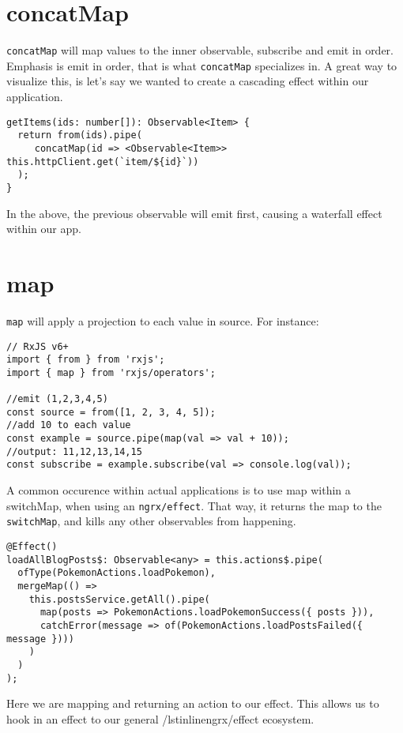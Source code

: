 \section{concatMap}
\lstinline{concatMap} will map values to the inner observable, subscribe and 
emit in order. Emphasis is emit in order, that is what \lstinline{concatMap} 
specializes in. A great way to visualize this, is let's say we wanted to 
create a cascading effect within our application. 

\begin{lstlisting}[caption=data-table.component.ts]
getItems(ids: number[]): Observable<Item> {
  return from(ids).pipe(
     concatMap(id => <Observable<Item>> this.httpClient.get(`item/${id}`))
  );
}
\end{lstlisting}

In the above, the previous observable will emit first, causing a waterfall 
effect within our app. 

\section{map} 
\lstinline{map} will apply a projection to each value in source. For instance: 
\begin{lstlisting}[caption=rxjs map example]
// RxJS v6+
import { from } from 'rxjs';
import { map } from 'rxjs/operators';

//emit (1,2,3,4,5)
const source = from([1, 2, 3, 4, 5]);
//add 10 to each value
const example = source.pipe(map(val => val + 10));
//output: 11,12,13,14,15
const subscribe = example.subscribe(val => console.log(val));
\end{lstlisting}

A common occurence within actual applications is to use map within a 
switchMap, when using an \lstinline{ngrx/effect}. That way, it returns the map
to the \lstinline{switchMap}, and kills any other observables from happening.

\begin{lstlisting}[caption=map example]
@Effect()
loadAllBlogPosts$: Observable<any> = this.actions$.pipe(
  ofType(PokemonActions.loadPokemon),
  mergeMap(() =>
    this.postsService.getAll().pipe(
      map(posts => PokemonActions.loadPokemonSuccess({ posts })),
      catchError(message => of(PokemonActions.loadPostsFailed({ message })))
    )
  )
);  
\end{lstlisting}

Here we are mapping and returning an action to our effect. This allows us to 
hook in an effect to our general /lstinline{ngrx/effect} ecosystem.

